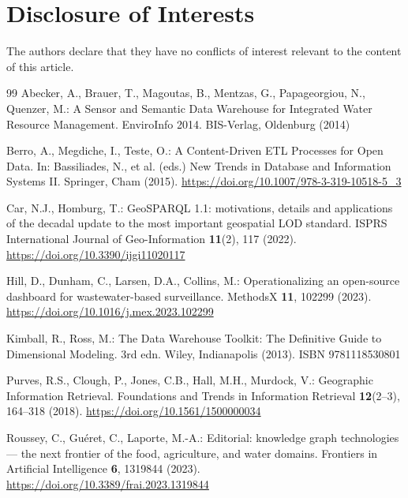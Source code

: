 \documentclass[runningheads]{llncs}
\newif\ifmarcarcambios
\newcommand{\icokg}[1]{\ifmarcarcambios\textcolor{nuevo}{#1}\else#1\fi}
\renewcommand{\_}{\origunderscore\allowbreak}
\begin{document}
\section*{Disclosure of Interests}
The authors declare that they have no conflicts of interest relevant to the content of this article.


\begingroup\footnotesize\setlength{\parskip}{0pt}
\begin{thebibliography}{99}
 Abecker, A., Brauer, T., Magoutas, B., Mentzas, G., Papageorgiou, N., Quenzer, M.: A Sensor and Semantic Data Warehouse for Integrated Water Resource Management. EnviroInfo 2014. BIS-Verlag, Oldenburg (2014)

 Berro, A., Megdiche, I., Teste, O.: A Content-Driven ETL Processes for Open Data. In: Bassiliades, N., et al. (eds.) New Trends in Database and Information Systems II. Springer, Cham (2015). \url{https://doi.org/10.1007/978-3-319-10518-5_3}

\icokg{ Car, N.J., Homburg, T.: GeoSPARQL 1.1: motivations, details and applications of the decadal update to the most important geospatial LOD standard. ISPRS International Journal of Geo-Information \textbf{11}(2), 117 (2022). \url{https://doi.org/10.3390/ijgi11020117}}

 Hill, D., Dunham, C., Larsen, D.A., Collins, M.: Operationalizing an open-source dashboard for wastewater-based surveillance. MethodsX \textbf{11}, 102299 (2023). \url{https://doi.org/10.1016/j.mex.2023.102299}

 Kimball, R., Ross, M.: The Data Warehouse Toolkit: The Definitive Guide to Dimensional Modeling. 3rd edn. Wiley, Indianapolis (2013). ISBN 9781118530801

 Purves, R.S., Clough, P., Jones, C.B., Hall, M.H., Murdock, V.: Geographic Information Retrieval. Foundations and Trends in Information Retrieval \textbf{12}(2--3), 164--318 (2018). \url{https://doi.org/10.1561/1500000034}

\icokg{ Roussey, C., Gu\'eret, C., Laporte, M.-A.: Editorial: knowledge graph technologies --- the next frontier of the food, agriculture, and water domains. Frontiers in Artificial Intelligence \textbf{6}, 1319844 (2023). \url{https://doi.org/10.3389/frai.2023.1319844}}


\end{thebibliography}
\end{document}
